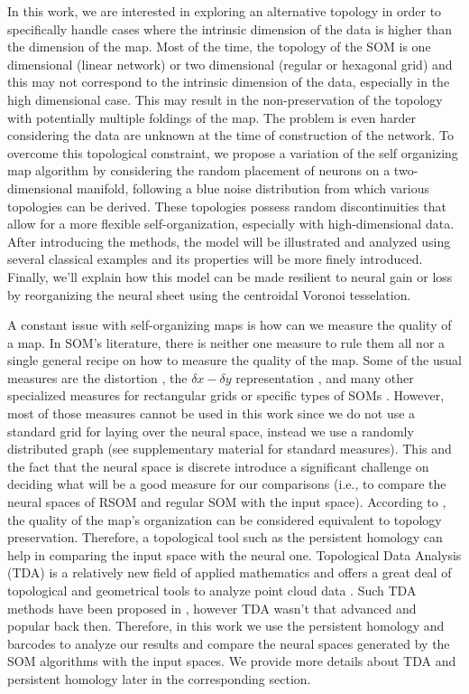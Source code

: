 In this work, we are interested in exploring an alternative topology in order to specifically handle cases where the intrinsic dimension of the data is higher than the dimension of the map. 
Most of the time, the topology of the SOM is one dimensional (linear network) or two dimensional (regular or hexagonal grid) and this may not correspond to the intrinsic dimension of the data, especially in the high dimensional case. This may result in the non-preservation of the topology \citep{Villmann:1999} with potentially multiple foldings of the map. The problem is even harder considering the data are unknown at the time of construction of the network. To overcome this topological constraint, we propose a variation of the self organizing map algorithm by considering the random placement of neurons on a two-dimensional manifold, following a blue noise distribution from which various topologies can be derived. These topologies possess random discontinuities that allow for a more flexible self-organization, especially with high-dimensional data. After introducing the methods, the model will be illustrated and analyzed using several classical examples and its properties will be more finely introduced. Finally, we'll explain how this model can be made resilient to neural gain or loss by reorganizing the neural sheet using the centroidal Voronoi tesselation.

A constant issue with self-organizing maps is how can we measure the quality of a map. In SOM's literature, there is neither one measure to rule them all nor a single general recipe on how to measure the quality of the map. Some of the usual measures are the distortion \cite{rynkiewicz:2008}, the $\delta x - \delta y$ representation \citep{Demartines:1992}, and many other specialized measures for rectangular grids or specific types of SOMs \citep{Polani2002}. However, most of those measures cannot be used in this work since we do not use a standard grid for laying over the neural space, instead we use a randomly distributed graph (see supplementary material for standard measures). This and the fact that the neural space is discrete introduce a significant challenge on deciding what will be a good measure for our comparisons \citep{Polani2002} (i.e., to compare the neural spaces of RSOM and regular SOM with the input space). According to \citep{Polani2002}, the quality of the map's organization can be considered equivalent to topology preservation. Therefore, a topological tool such as the persistent homology can help in comparing the input space with the neural one. Topological Data Analysis (TDA) is a relatively new field of applied mathematics and offers a great deal of topological and geometrical tools to analyze point cloud data \citep{Carlsson:2009,HerculanoHouzel:2013}. Such TDA methods have been proposed in \citep{Polani2002}, however TDA wasn't that advanced and popular back then. Therefore, in this work we use the persistent homology and barcodes to analyze our results and compare the neural spaces generated by the SOM algorithms with the input spaces. We provide more details about TDA and persistent homology later in the corresponding section.

